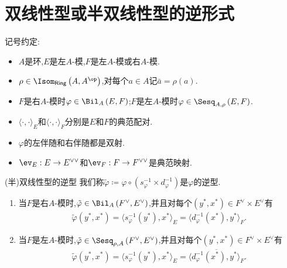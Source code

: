 \section{双线性型或半双线性型的逆形式}

记号约定:
\begin{itemize}
	\item $A$是环,$E$是左$A$-模,$F$是左$A$-模或右$A$-模.
	\item $\rho\in\Isom_{\mathsf{Ring}}\left(A,A^{\op}\right)$,对每个$a\in A$记$\bar{a}=\rho\left(a\right)$.
	\item $F$是右$A$-模时$\varphi\in\Bil_{A}\left(E,F\right)$;$F$是左$A$-模时$\varphi\in\Sesq_{A,\rho}\left(E,F\right)$.
	\item $\langle\cdot,\cdot\rangle_{E}$和$\langle\cdot,\cdot\rangle_{F}$分别是$E$和$F$的典范配对.
	\item $\varphi$的左伴随和右伴随都是双射.
	\item $\ev_{E}:E\to E^{\vee\vee}$和$\ev_{F}:F\to F^{\vee\vee}$是典范映射.
\end{itemize}

\begin{definition}{(半)双线性型的逆型}{}
	我们称$\tilde{\varphi}\coloneq\varphi\circ\left(s_{\varphi}^{-1}\times d_{\varphi}^{-1}\right)$是$\varphi$的逆型.
\end{definition}

\begin{remark}{}{}
	\begin{enumerate}
		\item 当$F$是右$A$-模时,$\tilde{\varphi}\in\Bil_{A}\left(F^{\vee},E^{\vee}\right)$,并且对每个$\left(y^{\ast},x^{\ast}\right)\in F^{\vee}\times E^{\vee}$有
		\begin{align*}
			\tilde{\varphi}\left(y^{\ast},x^{\ast}\right)=\langle s_{\varphi}^{-1}\left(y^{\ast}\right),x^{\ast}\rangle_{E}=\langle d_{\varphi}^{-1}\left(x^{\ast}\right),y^{\ast}\rangle_{F}.
		\end{align*}
		\item 当$F$是左$A$-模时,$\tilde{\varphi}\in\Sesq_{\rho,A}\left(F^{\vee},E^{\vee}\right)$,并且对每个$\left(y^{\ast},x^{\ast}\right)\in F^{\vee}\times E^{\vee}$有
		\begin{align*}
			\tilde{\varphi}\left(y^{\ast},x^{\ast}\right)=\langle s_{\varphi}^{-1}\left(y^{\ast}\right),x^{\ast}\rangle_{E}=\overline{\langle d_{\varphi}^{-1}\left(x^{\ast}\right),y^{\ast}\rangle_{F}}.
		\end{align*}
	\end{enumerate}
\end{remark}

